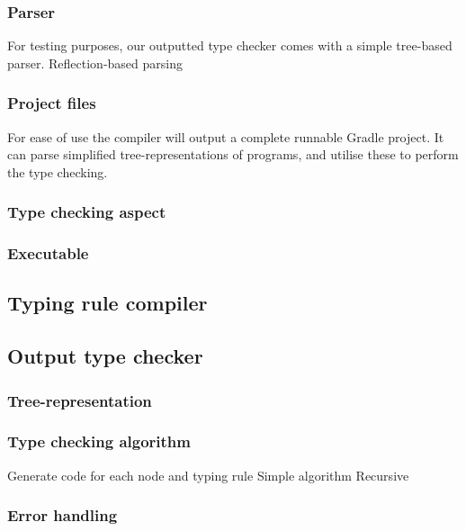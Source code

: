 \documentclass[nofilelist]{cslthse-msc}
\begin{document}
\subsubsection{Parser}\label{treebasedparser}
For testing purposes, our outputted type checker comes with a simple tree-based parser.
Reflection-based parsing

\subsubsection{Project files}\label{projectfiles}
For ease of use the compiler will output a complete runnable Gradle project.
It can parse simplified tree-representations of programs, and utilise these to perform the type checking.

\subsubsection{Type checking aspect}\label{typecheckingaspect}

\subsubsection{Executable}

\subsection{Typing rule compiler}\label{typingrulecompiler}

\subsection{Output type checker}
\subsubsection{Tree-representation}
\subsubsection{Type checking algorithm}\label{typecheckingalgorithm}
Generate code for each node and typing rule
Simple algorithm
Recursive
\subsubsection{Error handling}


\end{document}
